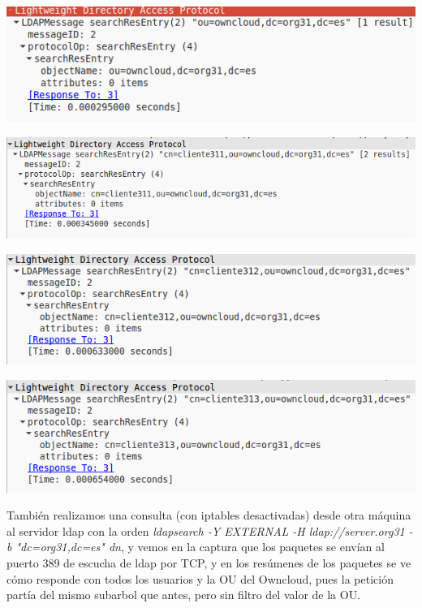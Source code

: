 \documentclass[]{article}
\begin{document}
\begin{center}
	\includegraphics[scale=0.5]{images/ldap/ldap3}
\end{center}
\begin{center}
	\includegraphics[scale=0.5]{images/ldap/ldap4}
\end{center}
\begin{center}
	\includegraphics[scale=0.5]{images/ldap/ldap5}
\end{center}

\begin{center}
	\includegraphics[scale=0.5]{images/ldap/ldap6}
\end{center}

\hfill

También realizamos una consulta (con iptables desactivadas) desde otra máquina al servidor ldap con la orden \textit{ldapsearch -Y EXTERNAL -H ldap://server.org31 -b "dc=org31,dc=es" dn}, y vemos en la captura que los paquetes se envían al puerto 389 de escucha de ldap por TCP, y en los resúmenes de los paquetes se ve cómo responde con todos los usuarios y la OU del Owncloud, pues la petición partía del mismo subarbol que antes, pero sin filtro del valor de la OU.
\end{document}
